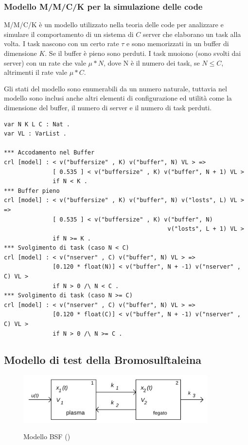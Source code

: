 \subsubsection{Modello M/M/C/K per la simulazione delle code}
\label{sec:mmck}

M/M/C/K è un modello utilizzato nella teoria delle code per analizzare e
simulare il comportamento di un sistema di $C$ server che elaborano un task
alla volta. I task nascono con un certo rate $\tau$ e sono memorizzati in un
buffer di dimensione $K$. Se il buffer è pieno sono perduti. I task muoiono
(sono svolti dai server) con un rate che vale $\mu * N$, dove N è il numero dei
task, se $N \leq C$, altrimenti il rate vale $\mu * C$.

Gli stati del modello sono enumerabili da un numero naturale, tuttavia nel
modello sono inclusi anche altri elementi di configurazione ed utilità come la
dimensione del buffer, il numero di server e il numero di task perduti.

\begin{Verbatim}[fontsize=\small]
var N K L C : Nat .
var VL : VarList .

*** Accodamento nel Buffer
crl [model] : < v("buffersize" , K) v("buffer", N) VL > =>
              [ 0.535 ] < v("buffersize" , K) v("buffer", N + 1) VL >
              if N < K .
*** Buffer pieno
crl [model] : < v("buffersize" , K) v("buffer", N) v("losts", L) VL > =>
              [ 0.535 ] < v("buffersize" , K) v("buffer", N)
                                               v("losts", L + 1) VL >
              if N >= K .
*** Svolgimento di task (caso N < C)
crl [model] : < v("nserver" , C) v("buffer", N) VL > =>
              [0.120 * float(N)] < v("buffer", N + -1) v("nserver" , C) VL >
              if N > 0 /\ N < C .
*** Svolgimento di task (caso N >= C)
crl [model] : < v("nserver" , C) v("buffer", N) VL > =>
              [0.120 * float(C)] < v("buffer", N + -1) v("nserver" , C) VL >
              if N > 0 /\ N >= C .

\end{Verbatim}

\subsection{Modello di test della Bromosulftaleina}
\label{sec:bsf}

\begin{figure}[!ht]
	\includegraphics[width=10cm]{../resources/images/BSF.png}
	\label{bsf}
	\caption{Modello BSF (\cite{gnudi})}
\end{figure}

